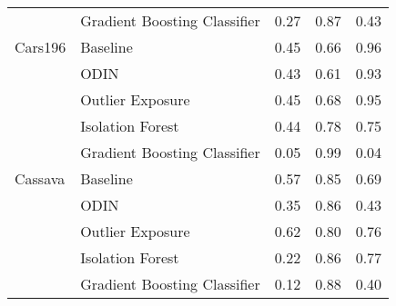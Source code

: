 \begin{table}
\begin{tabular}{llrrr}
        & Gradient Boosting Classifier &                        0.27 &    0.87 &           0.43 \\
Cars196 & Baseline &                        0.45 &    0.66 &           0.96 \\
        & ODIN &                        0.43 &    0.61 &           0.93 \\
        & Outlier Exposure &                        0.45 &    0.68 &           0.95 \\
        & Isolation Forest &                        0.44 &    0.78 &           0.75 \\
        & Gradient Boosting Classifier &                        0.05 &    0.99 &           0.04 \\
Cassava & Baseline &                        0.57 &    0.85 &           0.69 \\
        & ODIN &                        0.35 &    0.86 &           0.43 \\
        & Outlier Exposure &                        0.62 &    0.80 &           0.76 \\
        & Isolation Forest &                        0.22 &    0.86 &           0.77 \\
        & Gradient Boosting Classifier &                        0.12 &    0.88 &           0.40 \\
\bottomrule
\end{tabular}
\end{table}
